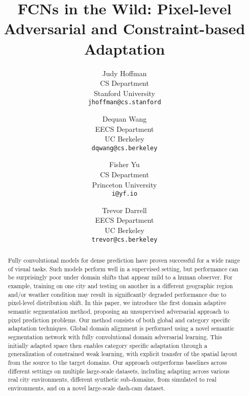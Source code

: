 \documentclass[10pt,twocolumn,letterpaper]{article}
\begin{document}
\title{FCNs in the Wild: Pixel-level Adversarial and Constraint-based Adaptation} 


\author{Judy Hoffman\\
CS Department\\
Stanford University\\
{\tt \small jhoffman@cs.stanford}
\and
Dequan Wang\\
EECS Department\\
UC Berkeley\\
{\tt\small dqwang@cs.berkeley}
\and
Fisher Yu\\
CS Department\\
Princeton University\\
{\tt\small i@yf.io}
\and
Trevor Darrell\\
EECS Department\\
UC Berkeley\\
{\tt\small trevor@cs.berkeley}
}

\maketitle


\begin{abstract}
    Fully convolutional models for dense prediction have proven successful for a wide range of visual tasks. 
    Such models perform well in a supervised setting, but performance can be surprisingly poor under domain shifts that appear mild to a human observer. 
    For example, training on one city and testing on another in a different geographic region and/or weather condition may result in significantly degraded performance due to pixel-level distribution shift. 
    In this paper, we introduce the first domain adaptive semantic segmentation method, proposing an unsupervised adversarial approach to pixel prediction problems. 
    Our method consists of both global and category specific adaptation techniques.
    Global domain alignment is performed using a novel semantic segmentation network with fully convolutional domain adversarial learning.
    This initially adapted space then enables category specific adaptation through a generalization of constrained weak learning, with explicit transfer of the spatial layout from the source to the target domains. 
    Our approach outperforms baselines across  different settings on multiple large-scale datasets, including adapting across various real city environments, different synthetic sub-domains, from simulated to real environments, and on a novel large-scale dash-cam dataset.
\end{abstract}
\end{document}
